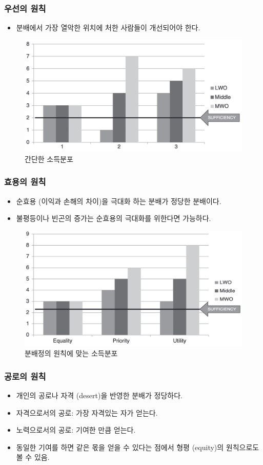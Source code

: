 \documentclass[aspectratio=169,xcolor=dvipsnames,handout]{beamer}
\begin{document}
\begin{frame}[<+->]
\frametitle{우선의 원칙}
    \begin{itemize}
        \item 분배에서 가장 열악한 위치에 처한 사람들이 개선되어야 한다.
    \end{itemize}
    \begin{figure}
        \centering
        \includegraphics[width=.5\textwidth]{pic/fig1_2.png}
        \caption{간단한 소득분포}
    \end{figure}
\end{frame}

\begin{frame}[<+->]
\frametitle{효용의 원칙}
    \begin{itemize}
        \item 순효용 (이익과 손해의 차이)을 극대화 하는 분배가 정당한 분배이다.
        \item 불평등이나 빈곤의 증가는 순효용의 극대화를 위한다면 가능하다.
    \end{itemize}
    \begin{figure}
        \centering
        \includegraphics[width=.5\textwidth]{pic/fig1_4.png}
        \caption{분배정의 원칙에 맞는 소득분포}
    \end{figure}
\end{frame}

\begin{frame}[<+->]
\frametitle{공로의 원칙}
    \begin{itemize}
        \item 개인의 공로나 자격 (desert)을 반영한 분배가 정당하다.
        \item 자격으로서의 공로: 가장 자격있는 자가 얻는다.
        \item 노력으로서의 공로: 기여한 만큼 얻는다.
        \item 동일한 기여를 하면 같은 몫을 얻을 수 있다는 점에서 형평 (equity)의 원칙으로도 볼 수 있음.
    \end{itemize}
\end{frame}
\end{document}
